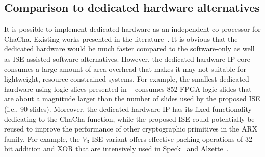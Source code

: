 \subsection{Comparison to dedicated hardware alternatives}
It is possible to implement dedicated hardware as an independent co-processor for ChaCha. 
Existing works presented in the literature~\cite{KLA:19,PRH:19}.
It is obvious that the dedicated hardware would be much faster compared to the software-only as well as ISE-assisted software alternatives.
However, the dedicated hardware IP core consumes a large amount of area overhead 
that makes it may not suitable for lightweight, resource-constrained systems.
For example, the smallest dedicated hardware using logic slices presented in ~\cite{PRH:19} consumes 852 FPGA logic slides that are about a magnitude larger than the number of slides used by the proposed ISE (i.e., 90 slides).
Moreover, the dedicated hardware IP has its fixed functionality dedicating to the ChaCha function, 
while the proposed ISE could potentially be reused 
to improve the performance of other cryptographic primitives in the ARX family.   
For example, the $V_3$ ISE variant offers effective packing operations of 32-bit addition and XOR 
that are intensively used in Speck~\cite{BSSTWW:13} and Alzette~\cite{BBC:20}.  


